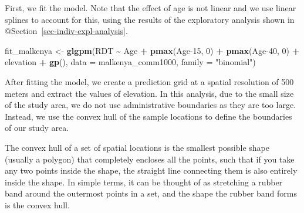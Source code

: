 \documentclass[
  letterpaper,
]{krantz}
\newenvironment{Shaded}{\begin{snugshade}}{\end{snugshade}}
\newcommand{\AttributeTok}[1]{\textcolor[rgb]{0.13,0.29,0.53}{#1}}
\newcommand{\DecValTok}[1]{\textcolor[rgb]{0.00,0.00,0.81}{#1}}
\newcommand{\FunctionTok}[1]{\textcolor[rgb]{0.13,0.29,0.53}{\textbf{#1}}}
\newcommand{\NormalTok}[1]{#1}
\newcommand{\OtherTok}[1]{\textcolor[rgb]{0.56,0.35,0.01}{#1}}
\newcommand{\SpecialCharTok}[1]{\textcolor[rgb]{0.81,0.36,0.00}{\textbf{#1}}}
\newcommand{\StringTok}[1]{\textcolor[rgb]{0.31,0.60,0.02}{#1}}
\begin{document}
First, we fit the model. Note that the effect of age is not linear and
we use linear splines to account for this, using the results of the
exploratory analysis shown in @Section~\ref{sec-indiv-expl-analysis}.

\begin{Shaded}
\begin{Highlighting}[]
\NormalTok{fit\_malkenya }\OtherTok{\textless{}{-}} \FunctionTok{glgpm}\NormalTok{(RDT }\SpecialCharTok{\textasciitilde{}}\NormalTok{ Age }\SpecialCharTok{+}  \FunctionTok{pmax}\NormalTok{(Age}\DecValTok{{-}15}\NormalTok{, }\DecValTok{0}\NormalTok{) }\SpecialCharTok{+} 
                        \FunctionTok{pmax}\NormalTok{(Age}\DecValTok{{-}40}\NormalTok{, }\DecValTok{0}\NormalTok{) }\SpecialCharTok{+}\NormalTok{ elevation }\SpecialCharTok{+}
                        \FunctionTok{gp}\NormalTok{(),}
                      \AttributeTok{data =}\NormalTok{ malkenya\_comm1000,}
                      \AttributeTok{family =} \StringTok{"binomial"}\NormalTok{)}
\end{Highlighting}
\end{Shaded}

After fitting the model, we create a prediction grid at a spatial
resolution of 500 meters and extract the values of elevation. In this
analysis, due to the small size of the study area, we do not use
administrative boundaries as they are too large. Instead, we use the
convex hull of the sample locations to define the boundaries of our
study area.

\begin{tcolorbox}[enhanced jigsaw, leftrule=.75mm, rightrule=.15mm, breakable, opacityback=0, coltitle=black, toprule=.15mm, toptitle=1mm, colbacktitle=quarto-callout-note-color!10!white, bottomrule=.15mm, opacitybacktitle=0.6, arc=.35mm, colback=white, title=\textcolor{quarto-callout-note-color}{\faInfo}\hspace{0.5em}{Note}, colframe=quarto-callout-note-color-frame, titlerule=0mm, bottomtitle=1mm, left=2mm]

The convex hull of a set of spatial locations is the smallest possible
shape (usually a polygon) that completely encloses all the points, such
that if you take any two points inside the shape, the straight line
connecting them is also entirely inside the shape. In simple terms, it
can be thought of as stretching a rubber band around the outermost
points in a set, and the shape the rubber band forms is the convex hull.

\end{tcolorbox}
\end{document}
